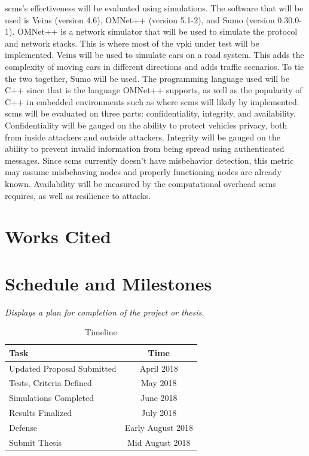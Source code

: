 \documentclass {article}
\newcommand{\sechint}[1]{\small{\emph{#1}} \bigskip}
\begin{document}
\gls{scms}'s effectiveness will be evaluated using simulations. The software that will be used is Veins (version 4.6), OMNet++ (version 5.1-2), and Sumo (version 0.30.0-1). OMNet++ is a network simulator that will be used to simulate the protocol and network stacks. This is where most of the \gls{vpki} under test will be implemented. Veins will be used to simulate cars on a road system. This adds the complexity of moving cars in different directions and adds traffic scenarios. To tie the two together, Sumo will be used.
The programming language used will be C++ since that is the language OMNet++ supports, as well as the popularity of C++ in embedded environments such as where \gls{scms} will likely by implemented. \gls{scms} will be evaluated on three parts: confidentiality, integrity, and availability. Confidentiality will be gauged on the ability to protect vehicles privacy, both from inside attackers and outside attackers. Integrity will be gauged on the ability to prevent invalid information from being spread using authenticated messages. Since \gls{scms} currently doesn't have misbehavior detection, this metric may assume misbehaving nodes and properly functioning nodes are already known. Availability will be measured by the computational overhead \gls{scms} requires, as well as resilience to attacks.

\pagebreak
\section{Works Cited}
\printbibliography[title={\ }]

\pagebreak
\section{Schedule and Milestones}{\sechint{Displays a plan for completion of the project or thesis.}}

\begin{table}[!ht]
	\centering
	\begin{tabular}{l|c}
		\hline
		Task & Time \\ \hline \hline
		Updated Proposal Submitted & April 2018 \\ \hline
		Tests, Criteria Defined & May 2018 \\ \hline
		Simulations Completed & June 2018 \\ \hline
		Results Finalized & July 2018 \\ \hline
		Defense & Early August 2018 \\ \hline
		Submit Thesis & Mid August 2018 \\ \hline
	\end{tabular}
	\caption{Timeline}
\end{table}
\end{document}
